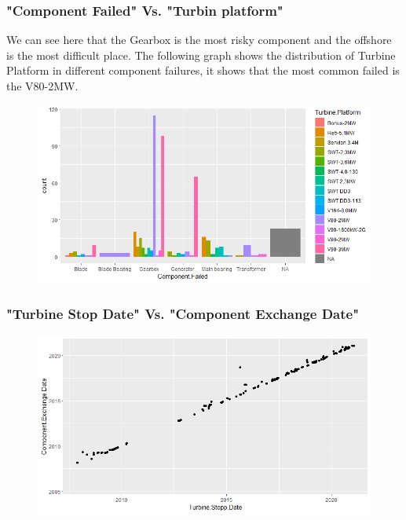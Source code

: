 \documentclass{beamer}
\begin{document}
\begin{frame}
\frametitle{ "Component Failed" Vs. "Turbin platform"}
We can see here that the Gearbox is the most risky component and the offshore is the most difficult place. The following graph shows the distribution of Turbine Platform in different component failures, it shows that the most common failed is the V80-2MW.\\

\begin{figure}
\includegraphics[width=0.8\linewidth]{Seminar_3_images/R/b vatten 2.png}
\end{figure}
\end{frame}





\begin{frame}

\frametitle{"Turbine Stop Date" Vs. "Component Exchange Date"}

\begin{figure}
\includegraphics[width=0.9\linewidth]{Seminar_3_images/R/b vatten 3.png}
\end{figure}
\end{frame}

\end{document}
